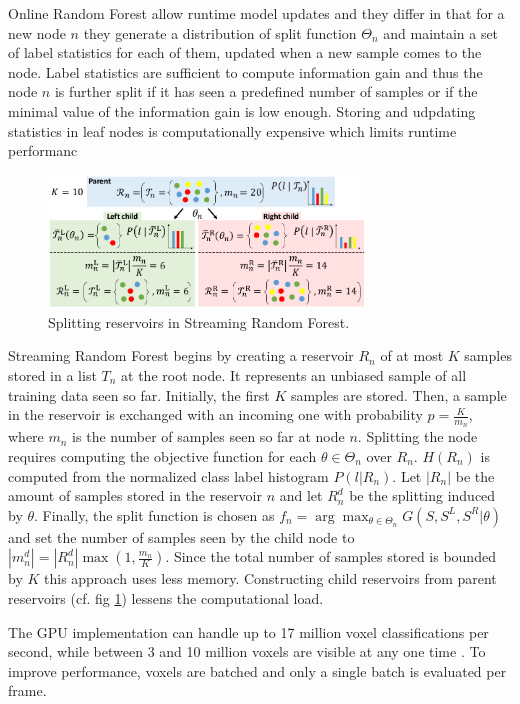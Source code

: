 \documentclass{llncs}
\begin{document}
  Online Random Forest \cite{online_forest} allow runtime model updates and they differ in that for a new node $n$ they generate a distribution of split function $\Theta_n$ and maintain a set of label statistics for each of them, updated when a new sample comes to the node. Label statistics are sufficient to compute information gain and thus the node $n$ is further split if it has seen a predefined number of samples or if the minimal value of the information gain is low enough. Storing and udpdating statistics in leaf nodes is computationally expensive which limits runtime performanc
  
\begin{figure}[!ht]
  \center
  \includegraphics[width=0.75\textwidth]{figures/forest}
  \caption{Splitting reservoirs in Streaming Random Forest.}
  \label{fig:forest}
\end{figure}
  
  Streaming Random Forest begins by creating a reservoir $R_n$ of at most $K$ samples stored in a list $T_n$ at the root node. It represents an unbiased sample of all training data seen so far. Initially, the first $K$ samples are stored. Then, a sample in the reservoir is exchanged with an incoming one with probability $p = \frac{K}{m_n}$, where $m_n$ is the number of samples seen so far at node $n$. Splitting the node requires computing the objective function for each $\theta \in \Theta_n$ over $R_n$. $H(R_n)$ is computed from the normalized class label histogram $P(l|R_n)$. Let $|R_n|$ be the amount of samples stored in the reservoir $n$ and let $R_n^d$ be the splitting induced by $\theta$. Finally, the split function is chosen as $f_n = \arg \max_{\theta \in \Theta_n} G(S, S^L, S^R | \theta)$  and set the number of samples seen by the child node to $|m_n^d| = |R_n^d| \max {\left(1, \frac{m_n}{K}\right)}$. Since the total number of samples stored is bounded by $K$ this approach uses less memory. Constructing child reservoirs from parent reservoirs (cf. fig \ref{fig:forest}) lessens the computational load.
  
  The GPU implementation can handle up to 17 million voxel classifications per second, while between 3 and 10 million voxels are visible at any one time \cite{hashed_voxel}. To improve performance, voxels are batched and only a single batch is evaluated per frame.
\end{document}
